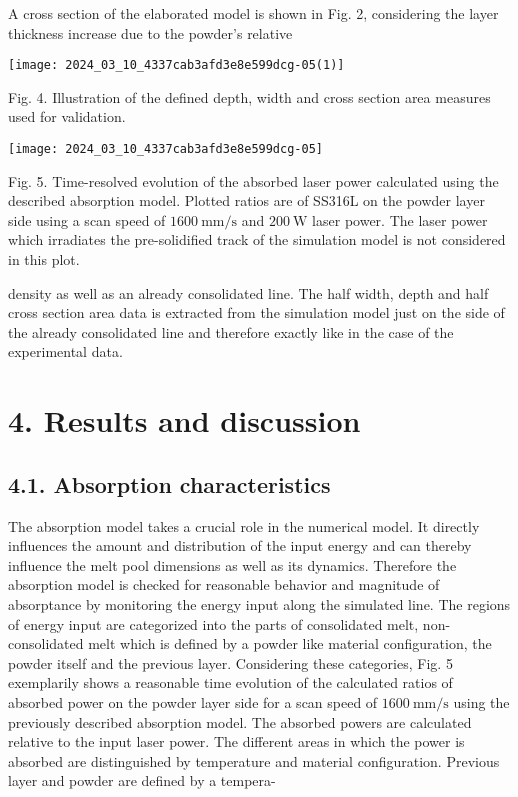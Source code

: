 \documentclass[10pt]{article}
\begin{document}
A cross section of the elaborated model is shown in Fig. 2, considering the layer thickness increase due to the powder's relative

\begin{center}
\texttt{[image: 2024\_03\_10\_4337cab3afd3e8e599dcg-05(1)]}
\end{center}

Fig. 4. Illustration of the defined depth, width and cross section area measures used for validation.

\begin{center}
\texttt{[image: 2024\_03\_10\_4337cab3afd3e8e599dcg-05]}
\end{center}

Fig. 5. Time-resolved evolution of the absorbed laser power calculated using the described absorption model. Plotted ratios are of SS316L on the powder layer side using a scan speed of $1600 \mathrm{~mm} / \mathrm{s}$ and $200 \mathrm{~W}$ laser power. The laser power which irradiates the pre-solidified track of the simulation model is not considered in this plot.

density as well as an already consolidated line. The half width, depth and half cross section area data is extracted from the simulation model just on the side of the already consolidated line and therefore exactly like in the case of the experimental data.

\section*{4. Results and discussion}
\subsection*{4.1. Absorption characteristics}
The absorption model takes a crucial role in the numerical model. It directly influences the amount and distribution of the input energy and can thereby influence the melt pool dimensions as well as its dynamics. Therefore the absorption model is checked for reasonable behavior and magnitude of absorptance by monitoring the energy input along the simulated line. The regions of energy input are categorized into the parts of consolidated melt, non-consolidated melt which is defined by a powder like material configuration, the powder itself and the previous layer. Considering these categories, Fig. 5 exemplarily shows a reasonable time evolution of the calculated ratios of absorbed power on the powder layer side for a scan speed of $1600 \mathrm{~mm} / \mathrm{s}$ using the previously described absorption model. The absorbed powers are calculated relative to the input laser power. The different areas in which the power is absorbed are distinguished by temperature and material configuration. Previous layer and powder are defined by a tempera-
\end{document}

